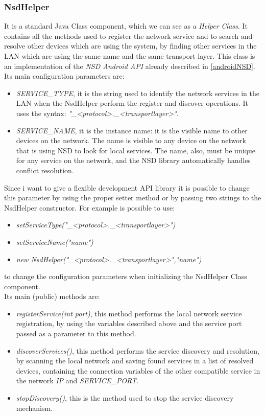 \subsubsection{NsdHelper}
It is a standard Java Class component, which we can see as a \textit{Helper Class}. It contains all the methods used to register the network service and to search and resolve other devices which are using the system, by finding other services in the LAN which are using the same name and the same transport layer. This class is an implementation of the \textit{NSD Android API} already described in \ref{androidNSD}.
Its main configuration parameters are:
\begin{itemize}
	\item \textit{SERVICE\_TYPE}, it is the string used to identify the network services in the LAN when the NsdHelper perform the register and discover operations. It uses the syntax: \textit{"\_<protocol>.\_<transportlayer>"}. 
	\item \textit{SERVICE\_NAME}, it is the instance name: it is the visible name to other devices on the network. The name is visible to any device on the network that is using NSD to look for local services. The name, also, must be unique for any service on the network, and the NSD library automatically handles conflict resolution.
\end{itemize}
 Since i want to give a flexible development API library it is possible to change this parameter by using the proper setter method or by passing two strings to the NsdHelper constructor. For example is possible to use:
 \begin{itemize}
 	\item \textit{setServiceType("\_<protocol>.\_<transportlayer>")}
 	\item \textit{setServiceName("name")}
 	\item \textit{new NsdHelper("\_<protocol>.\_<transportlayer>","name")} 
 \end{itemize} to change the configuration parameters when initializing the NsdHelper Class component.\\
Its main (public) methods are:
\begin{itemize}
	\item \textit{registerService(int port)}, this method performs the local network service registration, by using the variables described above and the service port passed as a parameter to this method.
	\item \textit{discoverServices()}, this method performs the service discovery and resolution, by scanning the local network and saving found services in a list of resolved devices, containing the connection variables of the other compatible service in the network \textit{IP} and \textit{SERVICE\_PORT}.
	\item \textit{stopDiscovery()}, this is the method used to stop the service discovery mechanism.
\end{itemize}

